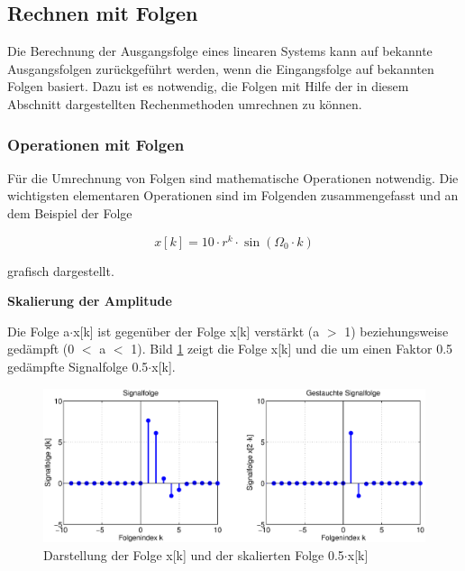 \clearpage

\subsection{Rechnen mit Folgen}

\noindent Die Berechnung der Ausgangsfolge eines linearen Systems kann auf bekannte Ausgangsfolgen zur\"{u}ckgef\"{u}hrt werden, wenn die Eingangsfolge auf bekannten Folgen basiert. Dazu ist es notwendig, die Folgen mit Hilfe der in diesem Abschnitt dargestellten Rechenmethoden umrechnen zu k\"{o}nnen. 

\subsubsection{Operationen mit Folgen}

\noindent F\"{u}r die Umrechnung von Folgen sind mathematische Operationen notwendig. Die wichtigsten elementaren Operationen sind im Folgenden zusammengefasst und an dem Beispiel der Folge 

\begin{equation}\label{eq:threefourtytwo}
x\left[k\right]=10\cdot r^{k} \cdot \sin \left(\Omega _{0} \cdot k\right)
\end{equation}

\noindent grafisch dargestellt.\bigskip

{\selectfont
\noindent\textbf{Skalierung der Amplitude}} \smallskip

\noindent Die Folge a$\cdot$x[k] ist gegen\"{u}ber der Folge x[k] verst\"{a}rkt (a $\mathrm{>}$ 1) beziehungsweise ged\"{a}mpft (0 $\mathrm{<}$ a $\mathrm{<}$ 1). Bild \ref{fig:ZeitlicheSkalierungFolgen} zeigt die Folge x[k] und die um einen Faktor 0.5 ged\"{a}mpfte Signalfolge 0.5$\cdot$x[k].

\begin{figure}[H]
  \centerline{\includegraphics[width=1\textwidth]{Kapitel3/Bilder/image14.eps}}
  \caption{Darstellung der Folge x[k] und der skalierten Folge 0.5$\cdot$x[k]}
  \label{fig:ZeitlicheSkalierungFolgen}
\end{figure}

